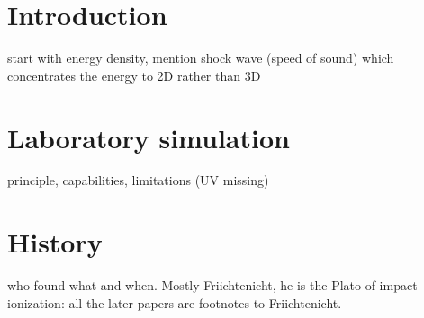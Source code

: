 \section{Introduction}

start with energy density, mention shock wave (speed of sound) which concentrates the energy to 2D rather than 3D

\section{Laboratory simulation}

principle, capabilities, limitations (UV missing)

\section{History}

who found what and when. Mostly Friichtenicht, he is the Plato of impact ionization: all the later papers are footnotes to Friichtenicht. 



